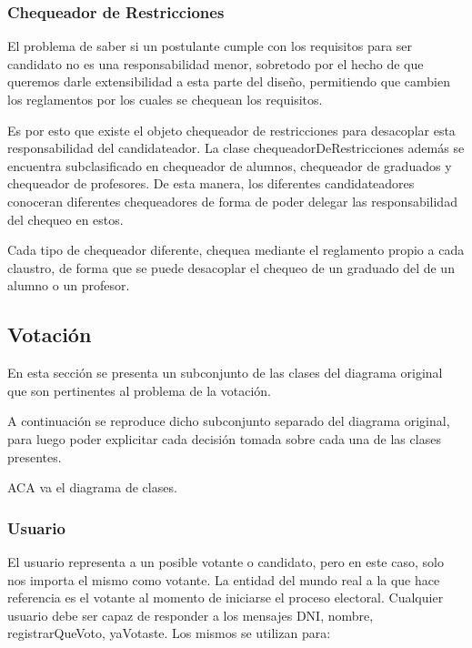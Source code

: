 \subsubsection{Chequeador de Restricciones}

El problema de saber si un postulante cumple con los requisitos para ser candidato no es una responsabilidad menor, sobretodo por el hecho de que queremos darle extensibilidad a esta parte del diseño, permitiendo que cambien los reglamentos por los cuales se chequean los requisitos.

Es por esto que existe el objeto chequeador de restricciones para desacoplar esta responsabilidad del candidateador. La clase chequeadorDeRestricciones adem\'as se encuentra subclasificado en chequeador de alumnos, chequeador de graduados y chequeador de profesores. De esta manera, los diferentes candidateadores conoceran diferentes chequeadores de forma de poder delegar las responsabilidad del chequeo en estos.

Cada tipo de chequeador diferente, chequea mediante el reglamento propio a cada claustro, de forma que se puede desacoplar el chequeo de un graduado del de un alumno o un profesor.

\subsection{Votaci\'on}


En esta secci\'on se presenta un subconjunto de las clases del diagrama original que son pertinentes al problema de la votaci\'on.

A continuaci\'on se reproduce dicho subconjunto separado del diagrama original, para luego poder explicitar cada decisi\'on tomada sobre cada una de las clases presentes.

ACA va el diagrama de clases.

\subsubsection{Usuario}

El usuario representa a un posible votante o candidato, pero en este caso, solo nos importa el mismo como votante. La entidad del mundo real a la que hace referencia es el votante al momento de iniciarse el proceso electoral. Cualquier usuario debe ser capaz de responder a los mensajes DNI, nombre, registrarQueVoto, yaVotaste. Los mismos se utilizan para:

